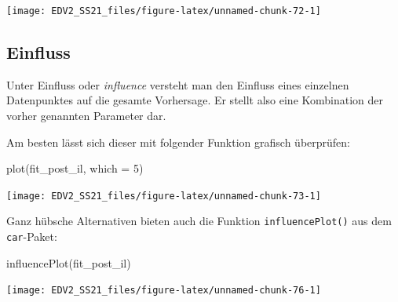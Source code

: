 \documentclass[
]{book}
\newenvironment{Shaded}{\begin{snugshade}}{\end{snugshade}}
\newcommand{\AttributeTok}[1]{\textcolor[rgb]{0.77,0.63,0.00}{#1}}
\newcommand{\DecValTok}[1]{\textcolor[rgb]{0.00,0.00,0.81}{#1}}
\newcommand{\FunctionTok}[1]{\textcolor[rgb]{0.00,0.00,0.00}{#1}}
\newcommand{\NormalTok}[1]{#1}
\begin{document}
\begin{center}\texttt{[image: EDV2\_SS21\_files/figure-latex/unnamed-chunk-72-1]} \end{center}

\hypertarget{einfluss}{%
\subsection{Einfluss}\label{einfluss}}

Unter Einfluss oder \emph{influence} versteht man den Einfluss eines einzelnen Datenpunktes auf die gesamte Vorhersage. Er stellt also eine Kombination der vorher genannten Parameter dar.

Am besten lässt sich dieser mit folgender Funktion grafisch überprüfen:

\begin{Shaded}
\begin{Highlighting}[]
\FunctionTok{plot}\NormalTok{(fit\_post\_il, }\AttributeTok{which =} \DecValTok{5}\NormalTok{)}
\end{Highlighting}
\end{Shaded}

\begin{center}\texttt{[image: EDV2\_SS21\_files/figure-latex/unnamed-chunk-73-1]} \end{center}

Ganz hübsche Alternativen bieten auch die Funktion \texttt{influencePlot()} aus dem \texttt{car}-Paket:

\begin{Shaded}
\begin{Highlighting}[]
\FunctionTok{influencePlot}\NormalTok{(fit\_post\_il)}
\end{Highlighting}
\end{Shaded}

\begin{center}\texttt{[image: EDV2\_SS21\_files/figure-latex/unnamed-chunk-76-1]} \end{center}

 
  \providecommand{\huxb}[2]{\arrayrulecolor[RGB]{#1}\global\arrayrulewidth=#2pt}
  \providecommand{\huxvb}[2]{\color[RGB]{#1}\vrule width #2pt}
  \providecommand{\huxtpad}[1]{\rule{0pt}{#1}}
  \providecommand{\huxbpad}[1]{\rule[-#1]{0pt}{#1}}
\end{document}
